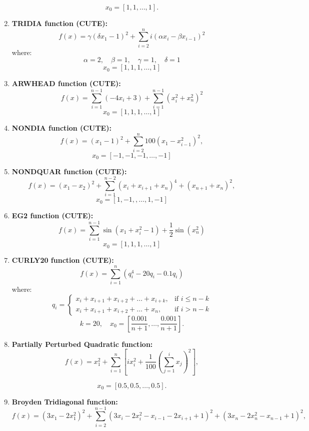\begin{enumerate}
    \[
    x_0 = [1, 1, \ldots, 1].
    \]


    \item \textbf{TRIDIA function (CUTE):}
    \[
    f(x) = \gamma(\delta x_1 - 1)^2 + \sum_{i=2}^{n} i \left( \alpha x_i - \beta x_{i-1}\right)^2 
    \]
    where:
    \[
        \alpha = 2, \quad \beta = 1, \quad \gamma = 1, \quad \delta = 1
    \]
    \[
    x_0 = [1, 1, 1, \dots, 1]
    \]

    \item \textbf{ARWHEAD function (CUTE):}
    \[
    f(x) = \sum_{i=1}^{n-1} \left( -4x_i + 3 \right) + \sum_{i=1}^{n-1} \left(x_i^2 + x_n^2\right)^2
    \]
    \[
    x_0 = [1, 1, 1, \dots, 1]
    \]

    \item \textbf{NONDIA function (CUTE):}
    \[
    f(x) = (x_1 - 1)^2 + \sum_{i=2}^{n} 100\left(x_1 -  x_{i-1}^2\right)^2,
    \]
    \[
    x_0 = [-1, -1, -1, \dots, -1]
    \]

    \item \textbf{NONDQUAR function (CUTE):}
    \[
    f(x) = \left(x_1 - x_2\right)^2 + \sum_{i=1}^{n-2} \left( x_i + x_{i+1} + x_n \right)^4 + (x_{n+1} + x_n)^2,
    \]
    \[
    x_0 = [1, -1,, \dots, 1, -1]
    \]

    \item \textbf{EG2 function (CUTE):}
    \[
    f(x) = \sum_{i=1}^{n-1} \sin(x_1 + x_i^2 -1) + \frac{1}{2}\sin(x_n^2)
    \]
    \[
    x_0 = [1, 1, 1, \dots, 1]
    \]

    \item \textbf{CURLY20 function (CUTE):}
    \[
    f(x) = \sum_{i=1}^{n} \left( q_i^4 -20q_i - 0.1q_i \right)
    \]
    where:
    \[
    q_i = 
    \begin{cases} 
        x_i + x_{i+1} + x_{i+2} + \dots + x_{i+k}, & \text{if } i \leq n-k \\
        x_i + x_{i+1} + x_{i+2} + \dots + x_n, & \text{if } i > n-k
    \end{cases}
    \]
    \[
    k = 20, \quad x_0 = \left[ \frac{0.001}{n+1}, \ldots, \frac{0.001}{n+1} \right].
    \]

    \item \textbf{Partially Perturbed Quadratic function:}
    \[
    f(x) = x_1^2 + \sum_{i=1}^n \left[ i x_i^2 + \frac{1}{100} \left( \sum_{j=1}^i x_j \right)^2 \right],
    \]
    
    \[
    x_0 = [0.5, 0.5, \ldots, 0.5].
    \]

    \item \textbf{Broyden Tridiagonal function:}
    \[
    f(x) = \left( 3x_1 - 2x_1^2 \right)^2 + \sum_{i=2}^{n-1} \left( 3x_i - 2x_i^2 - x_{i-1} - 2x_{i+1} + 1 \right)^2 + \left( 3x_n - 2x_n^2 - x_{n-1} + 1 \right)^2,
    \]


\end{enumerate}
